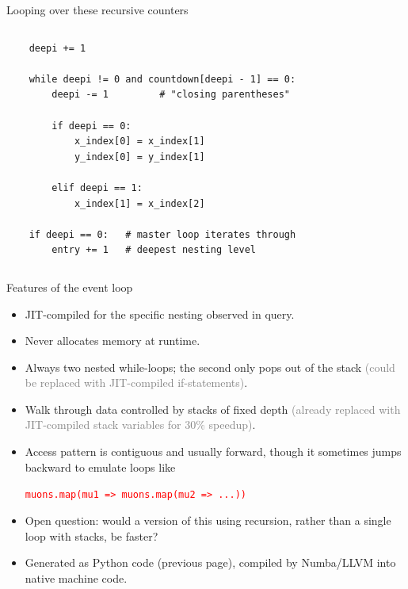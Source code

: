 \documentclass{beamer}
\begin{document}
\begin{frame}[fragile]{Looping over these recursive counters}
\begin{columns}[t]
\begin{verbatim}
    deepi += 1

    while deepi != 0 and countdown[deepi - 1] == 0:
        deepi -= 1         # "closing parentheses"

        if deepi == 0:
            x_index[0] = x_index[1]
            y_index[0] = y_index[1]

        elif deepi == 1:
            x_index[1] = x_index[2]

    if deepi == 0:   # master loop iterates through
        entry += 1   # deepest nesting level
\end{verbatim}
\end{columns}
\end{frame}

\begin{frame}{Features of the event loop}
\vspace{0.4 cm}
\begin{itemize}\setlength{\itemsep}{0.2 cm}
\item JIT-compiled for the specific nesting observed in query.
\item Never allocates memory at runtime.
\item Always two nested while-loops; the second only pops out of the stack \textcolor{gray}{(could be replaced with JIT-compiled if-statements)}.
\item Walk through data controlled by stacks of fixed depth \textcolor{gray}{(already replaced with JIT-compiled stack variables for 30\% speedup)}.
\item Access pattern is contiguous and usually forward, though it sometimes jumps backward to emulate loops like
\begin{center}
\textcolor{red}{\tt muons.map(mu1 => muons.map(mu2 => ...))}
\end{center}
\item Open question: would a version of this using recursion, rather than a single loop with stacks, be faster?
\item Generated as Python code (previous page), compiled by Numba/LLVM into native machine code.
\end{itemize}
\end{frame}
\end{document}
